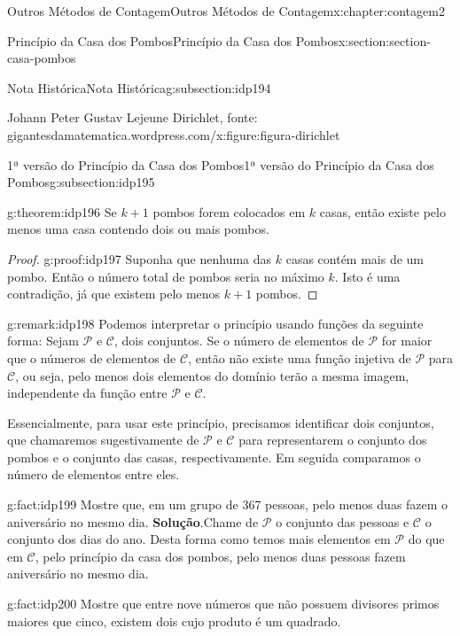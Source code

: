 \documentclass[oneside,10pt,]{book}
\newcommand{\blocktitlefont}{\relax}
\numberwithin{equation}{section}
\begin{document}
\begin{chapterptx}{Outros Métodos de Contagem}{}{Outros Métodos de Contagem}{}{}{x:chapter:contagem2}
\begin{sectionptx}{Princípio da Casa dos Pombos}{}{Princípio da Casa dos Pombos}{}{}{x:section:section-casa-pombos}
\begin{subsectionptx}{Nota Histórica}{}{Nota Histórica}{}{}{g:subsection:idp194}
\begin{figureptx}{Johann Peter Gustav Lejeune Dirichlet, fonte: gigantesdamatematica.wordpress.com\slash{}}{x:figure:figura-dirichlet}{}
\begin{image}{0.35}{0.3}{0.35}
\end{image}%
\tcblower
\end{figureptx}%
\end{subsectionptx}
%
%
\typeout{************************************************}
\typeout{************************************************}
%
\begin{subsectionptx}{1ª versão do Princípio da Casa dos Pombos}{}{1ª versão do Princípio da Casa dos Pombos}{}{}{g:subsection:idp195}
\begin{theorem}{}{}{g:theorem:idp196}%
Se \(k+1\) pombos forem colocados em \(k\) casas, então existe pelo menos uma casa contendo dois ou mais pombos.%
\end{theorem}
\begin{proof}{}{g:proof:idp197}
Suponha que nenhuma das \(k\) casas contém mais de um pombo. Então o número total de pombos seria no máximo \(k\). Isto é uma contradição, já que existem pelo menos \(k+1\) pombos.\end{proof}
\begin{remark}{}{g:remark:idp198}%
Podemos interpretar o princípio usando funções da seguinte forma: Sejam \(\mathcal{P}\) e \(\mathcal{C}\), dois conjuntos. Se o número de elementos de \(\mathcal{P}\) for maior que o números de elementos de \(\mathcal{C}\), então não existe uma função injetiva de \(\mathcal{P}\) para \(\mathcal{C}\), ou seja, pelo menos dois elementos do domínio terão a mesma imagem, independente da função entre \(\mathcal{P}\) e \(\mathcal{C}\).%
\par
Essencialmente, para usar este princípio, precisamos identificar dois conjuntos, que chamaremos sugestivamente de \(\mathcal{P}\) e \(\mathcal{C}\) para representarem o conjunto dos pombos e o conjunto das casas, respectivamente. Em seguida comparamos o número de elementos entre eles.%
\end{remark}
\begin{fact}{}{}{g:fact:idp199}%
Mostre que, em um grupo de 367 pessoas, pelo menos duas fazem o aniversário no mesmo dia.%
\textbf{\blocktitlefont Solução}.\quad{}Chame de \(\mathcal{P}\) o conjunto das pessoas e \(\mathcal{C}\) o conjunto dos dias do ano. Desta forma como temos mais elementos em \(\mathcal{P}\) do que em \(\mathcal{C}\), pelo princípio da casa dos pombos, pelo menos duas pessoas fazem aniversário no mesmo dia.%
\end{fact}
\begin{fact}{}{}{g:fact:idp200}%
Mostre que entre nove números que não possuem divisores primos maiores que cinco, existem dois cujo produto é um quadrado.%

\end{fact}
\end{subsectionptx}
\end{sectionptx}
\end{chapterptx}
\end{document}
